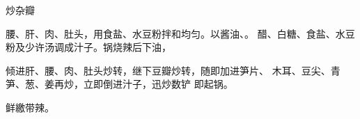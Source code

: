 \begin{recipe}{炒杂瓣}

\ingredients




\cooking

腰、肝、肉、肚头，用食盐、水豆粉拌和均匀。以酱油、。 醋、白糖、食盐、水豆粉及少许汤调成汁子。锅烧辣后下油，

倾进肝、腰、肉、肚头炒转，继下豆瓣炒转，随即加进笋片、 木耳、豆尖、青笋、葱、姜再炒，立即倒进汁子，迅炒数铲 即起锅。

\notes

鲜繳带辣。

\end{recipe}

